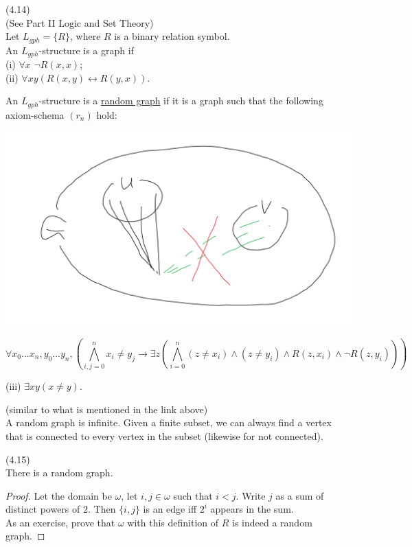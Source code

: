 \documentclass[a4paper]{article}
\begin{document}
\begin{defi} (4.14)\\
    (See Part II Logic and Set Theory)\\
    Let $L_{gph} = \{R\}$, where $R$ is a binary relation symbol.\\
    An $L_{gph}$-structure is a graph if\\
    (i) $\forall x$ $\neg R(x,x)$;\\
    (ii) $\forall xy (R(x,y) \leftrightarrow R(y,x))$.

    An $L_{gph}$-structure is a \href{http://modeltheory.wikia.com/wiki/Random_graph}{random graph} if it is a graph such that the following axiom-schema $(r_n)$ hold:

    \includegraphics[scale=0.5]{image/Model_05.png}

    $$\forall x_0...x_n,y_0...y_n, (\bigwedge_{i,j=0}^n x_i \neq y_j \to \exists z(\bigwedge_{i = 0}^n (z \neq x_i) \wedge (z \neq y_i) \wedge R(z,x_i) \wedge \neg R(z,y_i)))$$

    (iii) $\exists xy (x\neq y)$.
\end{defi}

\begin{rem} (similar to what is mentioned in the link above)\\
    A random graph is infinite. Given a finite subset, we can always find a vertex that is connected to every vertex in the subset (likewise for not connected).
\end{rem}

\begin{fact} (4.15)\\
    There is a random graph.
    \begin{proof}
        Let the domain be $\omega$, let $i,j \in \omega$ such that $i < j$. Write $j$ as a sum of distinct powers of $2$. Then $\{i,j\}$ is an edge iff $2^i$ appears in the sum.\\
        As an exercise, prove that $\omega$ with this definition of $R$ is indeed a random graph.
    \end{proof}
\end{fact}
\end{document}
